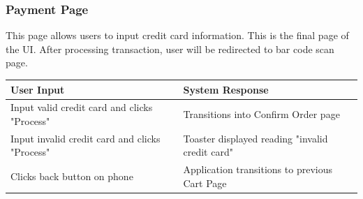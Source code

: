 \documentclass[12pt, titlepage]{article}
\begin{document}
\subsubsection{Payment Page}
This page allows users to input credit card information. This is the final page of the UI. After processing transaction, user will be redirected to bar code scan page. 
\begin{center}
    \begin{tabular}{ | l | p{7cm} |}
    \hline
    User Input & System Response \\ \hline
 	Input valid credit card and clicks "Process" & Transitions into Confirm Order page \\ \hline
    Input invalid credit card and clicks "Process" &  Toaster displayed reading "invalid credit card"\\ \hline
    Clicks back button on phone & Application transitions to previous Cart Page \\
    \hline
    \end{tabular}
\end{center}
\end{document}
